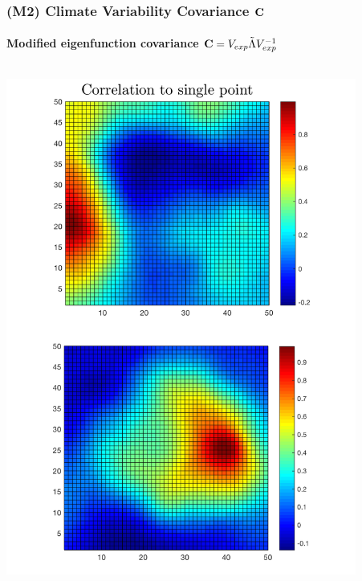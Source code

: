 \documentclass{beamer}
\newcommand{\C}{\ensuremath{\text{Cov}}}
\def\C{\textbf{\text{C}}}
\begin{document}
\begin{frame}
\frametitle{(M2) Climate Variability Covariance $\C$}
\framesubtitle{Modified eigenfunction covariance $\C = V_{exp} \tilde \Lambda V_{exp}^{-1}$}
\begin{columns}
\begin{column}{0.5\textwidth}
    \begin{center}
     \includegraphics[width=0.90\textwidth]{Images/modCorrelation.png} 
     \end{center}
\end{column}
\begin{column}{0.5\textwidth}
    \begin{center}

\end{center}
\end{column}
\end{columns}
\end{frame}
\end{document}
